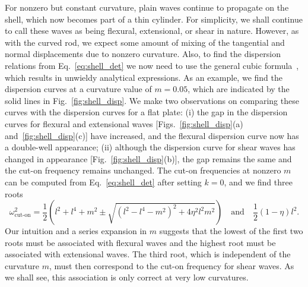 For nonzero but constant curvature, plain waves continue to propagate on the shell, which now becomes part of a thin cylinder.
For simplicity, we shall continue to call these waves as being flexural, extensional, or shear in nature.
However, as with the curved rod, we expect some amount of mixing of the tangential and normal displacements due to nonzero curvature.
Also, to find the dispersion relations from Eq.~\eqref{eq:shell_det} we now need to use the general cubic formula~\cite{olver2010}, which results in unwieldy analytical expressions.
As an example, we find the dispersion curves at a curvature value of $m = 0.05$, which are indicated by the solid lines in Fig.~\ref{fig:shell_disp}.
We make two observations on comparing these curves with the dispersion curves for a flat plate:
(i) the gap in the dispersion curves for flexural and extensional waves [Figs.~\ref{fig:shell_disp}(a) and~\ref{fig:shell_disp}(c)] have increased, and the flexural dispersion curve now has a double-well appearance;
(ii) although the dispersion curve for shear waves has changed in appearance [Fig.~\ref{fig:shell_disp}(b)], the gap remains the same and the cut-on frequency remains unchanged.
The cut-on frequencies at nonzero $m$ can be computed from Eq.~\eqref{eq:shell_det} after setting $k = 0$, and we find three roots
%
\begin{equation}
  \omega^{2}_{\text{cut-on}} =
    \frac{1}{2}\left(l^{2} + l^{4} + m^{2} \pm \sqrt{\left(l^{2} - l^{4} - m^{2}\right)^{2} + 4\eta^{2}l^{2}m^{2}}\right)
    \quad\text{and}\quad
    \frac{1}{2}(1-\eta)l^{2}.
    \label{eq:shell_cuton}
\end{equation}
%
Our intuition and a series expansion in $m$ suggests that the lowest of the first two roots must be associated with flexural waves and the highest root must be associated with extensional waves.
The third root, which is independent of the curvature $m$, must then correspond to the cut-on frequency for shear waves.
As we shall see, this association is only correct at very low curvatures.

